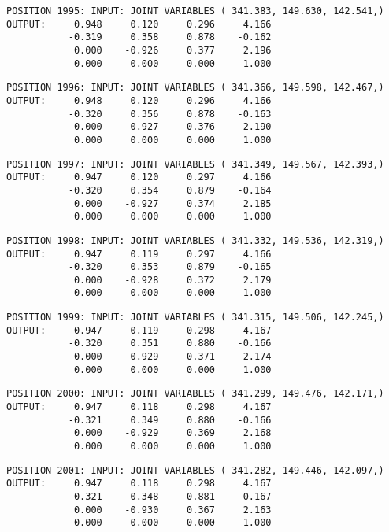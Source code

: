 \begin{verbatim}
POSITION 1995: INPUT: JOINT VARIABLES ( 341.383, 149.630, 142.541,)
OUTPUT:     0.948     0.120     0.296     4.166
           -0.319     0.358     0.878    -0.162
            0.000    -0.926     0.377     2.196
            0.000     0.000     0.000     1.000
\end{verbatim} \pagebreak[1]\begin{verbatim}
POSITION 1996: INPUT: JOINT VARIABLES ( 341.366, 149.598, 142.467,)
OUTPUT:     0.948     0.120     0.296     4.166
           -0.320     0.356     0.878    -0.163
            0.000    -0.927     0.376     2.190
            0.000     0.000     0.000     1.000
\end{verbatim} \pagebreak[1]\begin{verbatim}
POSITION 1997: INPUT: JOINT VARIABLES ( 341.349, 149.567, 142.393,)
OUTPUT:     0.947     0.120     0.297     4.166
           -0.320     0.354     0.879    -0.164
            0.000    -0.927     0.374     2.185
            0.000     0.000     0.000     1.000
\end{verbatim} \pagebreak[1]\begin{verbatim}
POSITION 1998: INPUT: JOINT VARIABLES ( 341.332, 149.536, 142.319,)
OUTPUT:     0.947     0.119     0.297     4.166
           -0.320     0.353     0.879    -0.165
            0.000    -0.928     0.372     2.179
            0.000     0.000     0.000     1.000
\end{verbatim} \pagebreak[1]\begin{verbatim}
POSITION 1999: INPUT: JOINT VARIABLES ( 341.315, 149.506, 142.245,)
OUTPUT:     0.947     0.119     0.298     4.167
           -0.320     0.351     0.880    -0.166
            0.000    -0.929     0.371     2.174
            0.000     0.000     0.000     1.000
\end{verbatim} \pagebreak[1]\begin{verbatim}
POSITION 2000: INPUT: JOINT VARIABLES ( 341.299, 149.476, 142.171,)
OUTPUT:     0.947     0.118     0.298     4.167
           -0.321     0.349     0.880    -0.166
            0.000    -0.929     0.369     2.168
            0.000     0.000     0.000     1.000
\end{verbatim} \pagebreak[1]\begin{verbatim}
POSITION 2001: INPUT: JOINT VARIABLES ( 341.282, 149.446, 142.097,)
OUTPUT:     0.947     0.118     0.298     4.167
           -0.321     0.348     0.881    -0.167
            0.000    -0.930     0.367     2.163
            0.000     0.000     0.000     1.000
\end{verbatim} \pagebreak[1]\begin{verbatim}

\end{verbatim}

